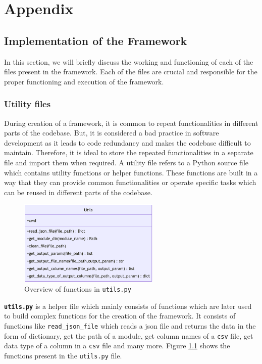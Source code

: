 \appendix
\chapter{Appendix}
\section{Implementation of the Framework} \label{implementation_framework}
In this section, we will briefly discuss the working and functioning of each of the files present in the framework. Each of the files are crucial and responsible
for the proper functioning and execution of the framework. 

\subsection{Utility files}
During creation of a framework, it is common to repeat functionalities in different parts of the codebase. But, it is considered a bad practice in software development as 
it leads to code redundancy and makes the codebase difficult to maintain. Therefore, it is ideal to store the repeated functionalities in a separate file and
import them when required. A utility file refers to a Python source file  which contains utility functions or helper functions. These functions are built in a 
way that they can provide common functionalities or operate specific tasks which can be reused in different parts of the codebase. 
\begin{figure}[!ht] %
  \centering
  \includegraphics[width=0.6\textwidth]{Images/utils.pdf}
  \caption{Overview of functions in \texttt{utils.py}}

  \label{utils_overview}
\end{figure}

\textbf{\texttt{utils.py}} is a helper file which mainly consists of functions which are later used to build complex functions for the creation of the framework.
It consists of functions like \texttt{read\_json\_file} which reads a \acrshort{json} file and returns the data in the form of dictionary, get the path of a module,
get column names of a \texttt{csv} file, get data type of a column in a \texttt{csv} file and many more. Figure \ref{utils_overview} shows the functions present 
in the \texttt{utils.py} file.

